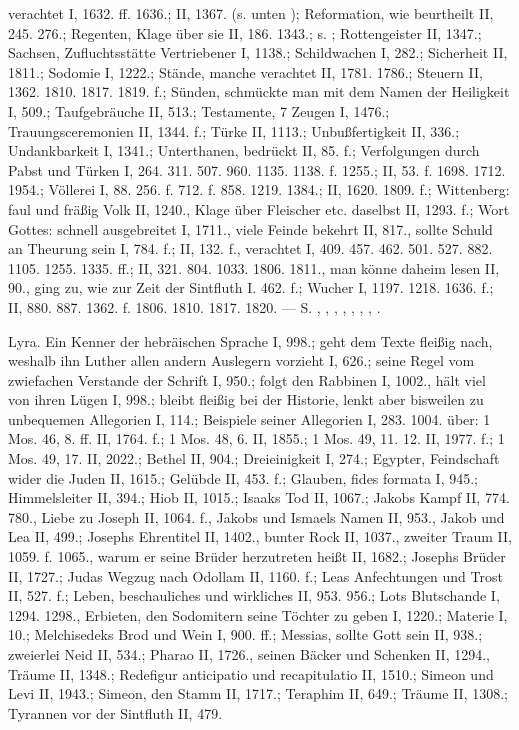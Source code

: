 verachtet I, 1632. ff. 1636.; II, 1367. (s. unten ); Reformation, wie beurtheilt II, 245. 276.; Regenten, Klage über sie II, 186. 1343.; s. ; Rottengeister II, 1347.; Sachsen, Zufluchtsstätte Vertriebener I, 1138.; Schildwachen I, 282.; Sicherheit II, 1811.; Sodomie I, 1222.; Stände, manche verachtet II, 1781. 1786.; Steuern II, 1362. 1810. 1817. 1819. f.; Sünden, schmückte man mit dem Namen der Heiligkeit I, 509.; Taufgebräuche II, 513.; Testamente, 7 Zeugen I, 1476.; Trauungsceremonien II, 1344. f.; Türke II, 1113.; Unbußfertigkeit II, 336.; Undankbarkeit I, 1341.; Unterthanen, bedrückt II, 85. f.; Verfolgungen durch Pabst und Türken I, 264. 311. 507. 960. 1135. 1138. f. 1255.; II, 53. f. 1698. 1712. 1954.; Völlerei I, 88. 256. f. 712. f. 858. 1219. 1384.; II, 1620. 1809. f.; Wittenberg: faul und fräßig Volk II, 1240., Klage über Fleischer etc. daselbst II, 1293. f.; Wort Gottes: schnell ausgebreitet I, 1711., viele Feinde bekehrt II, 817., sollte Schuld an Theurung sein I, 784. f.; II, 132. f., verachtet I, 409. 457. 462. 501. 527. 882. 1105. 1255. 1335. ff.; II, 321. 804. 1033. 1806. 1811., man könne daheim lesen II, 90., ging zu, wie zur Zeit der Sintfluth I. 462. f.; Wucher I, 1197. 1218. 1636. f.; II, 880. 887. 1362. f. 1806. 1810. 1817. 1820. — S. , , , , , , , .

Lyra. Ein Kenner der hebräischen Sprache I, 998.; geht dem Texte fleißig nach, weshalb ihn Luther allen andern Auslegern vorzieht I, 626.; seine Regel vom zwiefachen Verstande der Schrift I, 950.; folgt den Rabbinen I, 1002., hält viel von ihren Lügen I, 998.; bleibt fleißig bei der Historie, lenkt aber bisweilen zu unbequemen Allegorien I, 114.; Beispiele seiner Allegorien I, 283. 1004.  über: 1 Mos. 46, 8. ff. II, 1764. f.; 1 Mos. 48, 6. II, 1855.; 1 Mos. 49, 11. 12. II, 1977. f.; 1 Mos. 49, 17. II, 2022.; Bethel II, 904.; Dreieinigkeit I, 274.; Egypter, Feindschaft wider die Juden II, 1615.; Gelübde II, 453. f.; Glauben, fides formata I, 945.; Himmelsleiter II, 394.; Hiob II, 1015.; Isaaks Tod II, 1067.; Jakobs Kampf II, 774. 780., Liebe zu Joseph II, 1064. f., Jakobs und Ismaels Namen II, 953., Jakob und Lea II, 499.; Josephs Ehrentitel II, 1402., bunter Rock II, 1037., zweiter Traum II, 1059. f. 1065., warum er seine Brüder herzutreten heißt II, 1682.; Josephs Brüder II, 1727.; Judas Wegzug nach Odollam II, 1160. f.;
Leas Anfechtungen und Trost II, 527. f.; Leben, beschauliches und wirkliches II, 953. 956.; Lots Blutschande I, 1294. 1298., Erbieten, den Sodomitern seine Töchter zu geben I, 1220.; Materie I, 10.; Melchisedeks Brod und Wein I, 900. ff.; Messias, sollte Gott sein II, 938.; zweierlei Neid II, 534.; Pharao II, 1726., seinen Bäcker und Schenken II, 1294., Träume II, 1348.; Redefigur anticipatio und recapitulatio II, 1510.; Simeon und Levi II, 1943.; Simeon, den Stamm II, 1717.; Teraphim II, 649.; Träume II, 1308.; Tyrannen vor der Sintfluth II, 479.

